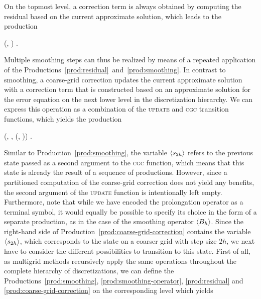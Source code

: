 On the topmost level, a correction term is always obtained by computing the residual based on the current approximate solution, which leads to the production
\begin{production}
	 {
		(, \bnfsp {}) 
	}.
\label{prod:residual}
\end{production}Multiple smoothing steps can thus be realized by means of a repeated application of the Productions~\eqref{prod:residual}~and~\eqref{prod:smoothing}.
In contrast to smoothing, a coarse-grid correction updates the current approximate solution with a correction term that is constructed based on an approximate solution for the error equation on the next lower level in the discretization hierarchy.
We can express this operation as a combination of the \textsc{update} and \textsc{cgc} transition functions, which yields the production
\begin{production}
	 {
		(\bnfts{$\omega$}, \bnfsp \bnfes, \bnfsp {}(, \bnfsp {}))
	}.
\label{prod:coarse-grid-correction}
\end{production}Similar to Production~\eqref{prod:smoothing}, the variable $\langle s_{2h} \rangle$ refers to the previous state passed as a second argument to the \textsc{cgc} function, which means that this state is already the result of a sequence of productions.
However, since a partitioned computation of the coarse-grid correction does not yield any benefits, the second argument of the \textsc{update} function is intentionally left empty.
Furthermore, note that while we have encoded the prolongation operator as a terminal symbol, it would equally be possible to specify its choice in the form of a separate production, as in the case of the smoothing operator $\langle B_h \rangle$.
Since the right-hand side of Production~\eqref{prod:coarse-grid-correction} contains the variable $\langle s_{2h} \rangle$, which corresponds to the state on a coarser grid with step size $2h$, we next have to consider the different possibilities to transition to this state.
First of all, as multigrid methods recursively apply the same operations throughout the complete hierarchy of discretizations, we can define the Productions~\eqref{prod:smoothing}, \eqref{prod:smoothing-operator}, \eqref{prod:residual} and \eqref{prod:coarse-grid-correction} on the corresponding level which yields
